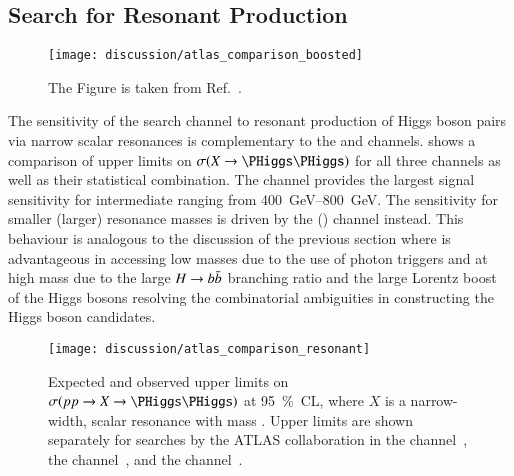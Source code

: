 

\subsection{Search for Resonant \HH Production}

\begin{figure}[htbp]
  \centering

  \texttt{[image: discussion/atlas\_comparison\_boosted]}

  \caption{The Figure is taken from Ref.~\cite{HDBS-2018-40}.}%
  \label{fig:comparison_resonant_atlas_incl_boosted}
\end{figure}

The sensitivity of the \bbtautau search channel to resonant production of Higgs
boson pairs via narrow scalar resonances is complementary to the \bbyy and \bbbb
channels.  shows a comparison of upper limits
on $\sigma(X \to \HH)$ for all three channels as well as their statistical
combination. The \bbtautau channel provides the largest signal sensitivity for
intermediate \mX ranging from \SIrange{400}{800}{\GeV}. The sensitivity for
smaller (larger) resonance masses is driven by the \bbyy (\bbbb) channel
instead. This behaviour is analogous to the discussion of the previous section
where \bbyy is advantageous in accessing low masses due to the use of photon
triggers and \bbbb at high mass due to the large $H \to b\bar{b}$ branching ratio
and the large Lorentz boost of the Higgs bosons resolving the combinatorial
ambiguities in constructing the Higgs boson candidates.

\begin{figure}[htbp]
  \centering

  \texttt{[image: discussion/atlas\_comparison\_resonant]}

  \caption{Expected and observed upper limits on $\sigma(\pp \to X \to \HH)$ at
    \SI{95}{\percent}~CL, where $X$ is a narrow-width, scalar resonance with
    mass \mX. Upper limits are shown separately for searches by the ATLAS
    collaboration in the \bbbb channel~\cite{HDBS-2018-41,hepdata.111124}, the
    \bbyy channel~\cite{HDBS-2018-34,hepdata.105864}, and the \bbtautau
    channel~\cite{HDBS-2018-40}.}%
  \label{fig:resonant_hh_limits}
\end{figure}

